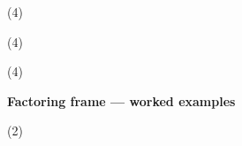 \documentclass[12pt,a4paper]{exam}
\begin{document}
\begin{questions}
\begin{tasks}(4)
  \task {}
  \task {}
  \task {}
  \task {}
\end{tasks}

\question
\begin{tasks}(4)
  \task {}
  \task {}
  \task {}
  \task {}
\end{tasks}

\question
\begin{tasks}(4)
  \task {}
  \task {}
  \task {}
  \task {}
\end{tasks}


\begin{center}\Large\bfseries Factoring frame --- worked examples\end{center}
\vspace{2mm}
\Large

\question
\begin{tasks}[after-item-skip=42mm](2)
  \task  {}
  \task {}
  \task {}
  \task  {}
    \task {}
  \task  {}
  \task {}
    \task {}
  \task {}
\end{tasks}

\end{questions}
\end{document}
